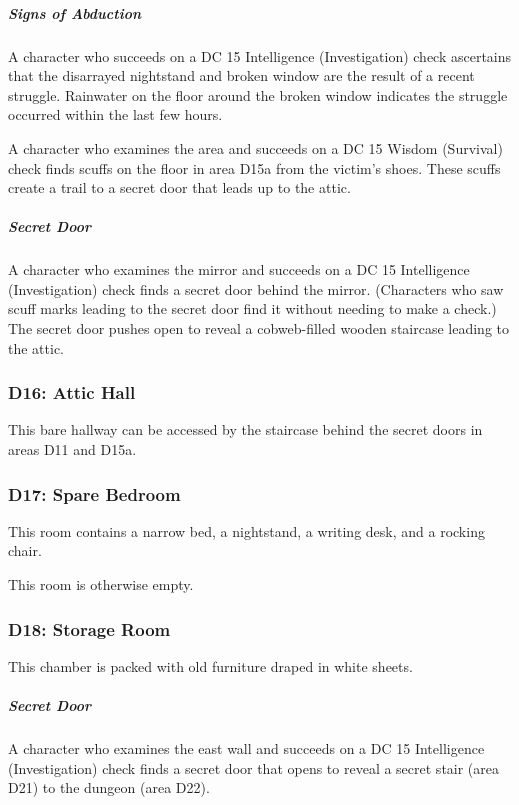 \documentclass[10pt,a4paper,twoside,bg=print,twocolumn,openany,nodeprecatedcode]{dndbook}
\begin{document}
\subparagraph{Signs of Abduction}
A character who succeeds on a DC 15 Intelligence (Investigation) check ascertains that the disarrayed nightstand and broken window are the result of a recent struggle. Rainwater on the floor around the broken window indicates the struggle occurred within the last few hours.

A character who examines the area and succeeds on a DC 15 Wisdom (Survival) check finds scuffs on the floor in area D15a from the victim's shoes. These scuffs create a trail to a secret door that leads up to the attic.

\subparagraph{Secret Door}
A character who examines the mirror and succeeds on a DC 15 Intelligence (Investigation) check finds a secret door behind the mirror. (Characters who saw scuff marks leading to the secret door find it without needing to make a check.) The secret door pushes open to reveal a cobweb-filled wooden staircase leading to the attic.

\subsubsection{D16: Attic Hall}
This bare hallway can be accessed by the staircase behind the secret doors in areas D11 and D15a.

\subsubsection{D17: Spare Bedroom}
\begin{DndReadAloud}{}
This room contains a narrow bed, a nightstand, a writing desk, and a rocking chair.

\end{DndReadAloud}

This room is otherwise empty.

\subsubsection{D18: Storage Room}
\begin{DndReadAloud}{}
This chamber is packed with old furniture draped in white sheets.

\end{DndReadAloud}

\subparagraph{Secret Door}
A character who examines the east wall and succeeds on a DC 15 Intelligence (Investigation) check finds a secret door that opens to reveal a secret stair (area D21) to the dungeon (area D22).
\end{document}
